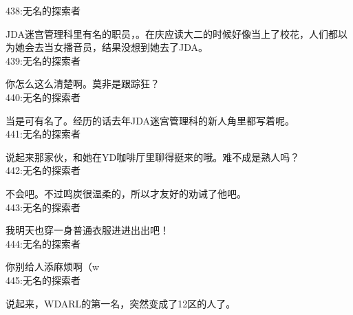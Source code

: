 438:无名的探索者

JDA迷宫管理科里有名的职员，。在庆应读大二的时候好像当上了校花，人们都以为她会去当女播音员，结果没想到她去了JDA。\\

439:无名的探索者

你怎么这么清楚啊。莫非是跟踪狂？\\

440:无名的探索者

当是可有名了。经历的话去年JDA迷宫管理科的新人角里都写着呢。\\

441:无名的探索者

说起来那家伙，和她在YD咖啡厅里聊得挺来的哦。难不成是熟人吗？\\

442:无名的探索者

不会吧。不过鸣炭很温柔的，所以才友好的劝诫了他吧。\\

443:无名的探索者

我明天也穿一身普通衣服进进出出吧！\\

444:无名的探索者

你别给人添麻烦啊（w\\

445:无名的探索者

说起来，WDARL的第一名，突然变成了12区的人了。\\

